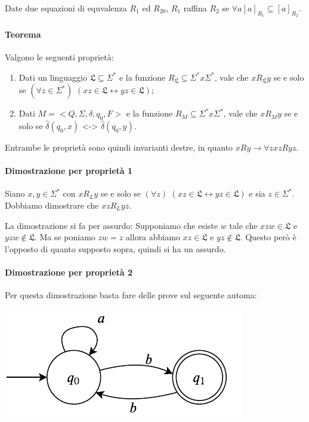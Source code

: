 \documentclass[a4paper, 10pt]{report}
\begin{document}
\noindent Date due equazioni di equvalenza $R_1$ ed $R_20$, $R_1$ raffina $R_2$ se $\forall a [a]_{R_1} \subseteq [a]_{R_2}$.

\paragraph*{Teorema} Valgono le seguenti proprietà:
\begin{enumerate}
\item Dati un linguaggio $\mathfrak{L} \subseteq \Sigma^*$ e la funzione $R_\mathfrak{L} \subseteq \Sigma^* x \Sigma^*$, vale che $x R_\mathfrak{L} y$ se e solo se $(\forall z \in \Sigma^*)$ $(xz \in \mathfrak{L} \longleftrightarrow yz \in \mathfrak{L})$; 
\item Dati $M = <Q, \Sigma, \delta, q_0, F>$ e la funzione $R_M \subseteq \Sigma^* x \Sigma^*$, vale che $x R_M y$ se e solo se $\hat{\delta}(q_0, x)$ <-> $\hat{\delta}(q_0, y)$.
\end{enumerate}

\noindent Entrambe le proprietà sono quindi invarianti destre, in quanto $x R y \rightarrow \forall z xz R yz$.\\

\begin{tcolorbox}[title=\textbf{Invarianza destra}]
\paragraph*{Dimostrazione per proprietà 1} Siano $x, y \in \Sigma^*$ con $x R_L y$ se e solo se $(\forall z)$ $(xz \in \mathfrak{L} \longleftrightarrow yz \in \mathfrak{L})$ e sia $z \in \Sigma^*$. Dobbiamo dimostrare che $xz R_L yz$. 

La dimostrazione si fa per assurdo: Supponiamo che esiste $w$ tale che $xzw \in \mathfrak{L}$ e $yzw \notin \mathfrak{L}$. Ma se poniamo $zw = z$ allora abbiamo $xz \in \mathfrak{L}$ e $yz \notin \mathfrak{L}$. Questo però è l'opposto di quanto supposto sopra, quindi si ha un assurdo.
\\
\paragraph*{Dimostrazione per proprietà 2} Per questa dimostrazione basta fare delle prove sul seguente automa:

\begin{center}
\includegraphics[scale=0.8]{1.pdf}
\end{center}
\end{tcolorbox}
\end{document}
